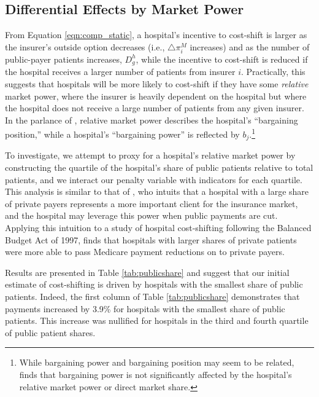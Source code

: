 \documentclass[12pt]{article}
\begin{document}
\subsection{Differential Effects by Market Power}
From Equation \ref{eqn:comp_static}, a hospital's incentive to cost-shift is larger as the insurer's outside option decreases (i.e., $\triangle \pi_{i}^{M}$ increases) and as the number of public-payer patients increases, $D_{g}^{h}$, while the incentive to cost-shift is reduced if the hospital receives a larger number of patients from insurer $i$. Practically, this suggests that hospitals will be more likely to cost-shift if they have some \textit{relative} market power, where the insurer is heavily dependent on the hospital but where the hospital does not receive a large number of patients from any given insurer. In the parlance of \cite{lewis2015}, relative market power describes the hospital's ``bargaining position,'' while a hospital's ``bargaining power'' is reflected by $b_{j}$.\footnote{While bargaining power and bargaining position may seem to be related, \cite{lewis2015} finds that bargaining power is not significantly affected by the hospital's relative market power or direct market share.}

To investigate, we attempt to proxy for a hospital's relative market power by constructing the quartile of the hospital's share of public patients relative to total patients, and we interact our penalty variable with indicators for each quartile. This analysis is similar to that of \cite{wu2010}, who intuits that a hospital with a large share of private payers represents a more important client for the insurance market, and the hospital may leverage this power when public payments are cut. Applying this intuition to a study of hospital cost-shifting following the Balanced Budget Act of 1997, \cite{wu2010} finds that hospitals with larger shares of private patients were more able to pass Medicare payment reductions on to private payers.

Results are presented in Table \ref{tab:publicshare} and suggest that our initial estimate of cost-shifting is driven by hospitals with the smallest share of public patients. Indeed, the first column of Table \ref{tab:publicshare} demonstrates that payments increased by 3.9\% for hospitals with the smallest share of public patients. This increase was nullified for hospitals in the third and fourth quartile of public patient shares.
\end{document}
